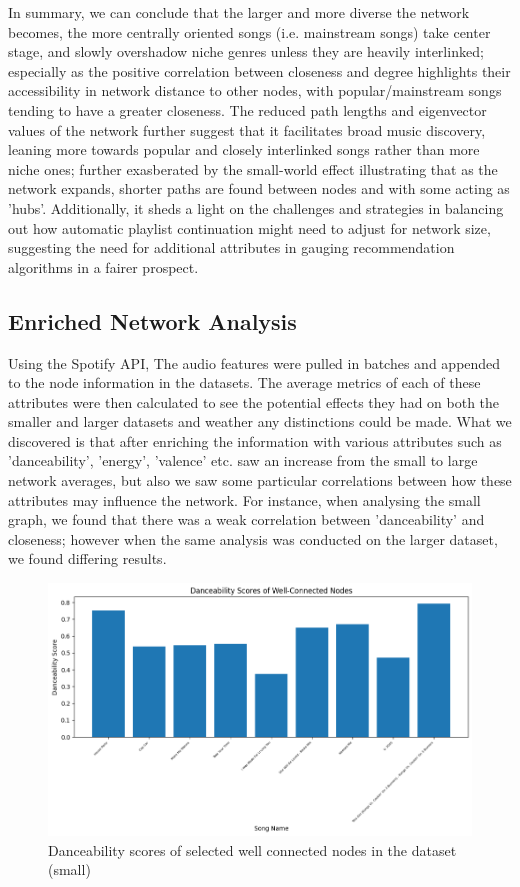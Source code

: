 \documentclass[conference]{IEEEtran}
\begin{document}
In summary, we can conclude that the larger and more diverse the network becomes, the more centrally oriented songs (i.e. mainstream songs) take center stage, and slowly overshadow niche genres unless they are heavily interlinked; especially as the positive correlation between closeness and degree highlights their accessibility in network distance to other nodes, with popular/mainstream songs tending to have a greater closeness. The reduced path lengths and eigenvector values of the network further suggest that it facilitates broad music discovery, leaning more towards popular and closely interlinked songs rather than more niche ones; further exasberated by the small-world effect illustrating that as the network expands, shorter paths are found between nodes and with some acting as 'hubs'. Additionally, it sheds a light on the challenges and strategies in balancing out how automatic playlist continuation might need to adjust for network size, suggesting the need for additional attributes in gauging recommendation algorithms in a fairer prospect.\\

\subsection{Enriched Network Analysis}
Using the Spotify API, The audio features were pulled in batches and appended to the node information in the datasets. The average metrics of each of these attributes were then calculated to see the potential effects they had on both the smaller and larger datasets and weather any distinctions could be made. What we discovered is that after enriching the information with various attributes such as 'danceability', 'energy', 'valence' etc. saw an increase from the small to large network averages, but also we saw some particular correlations between how these attributes may influence the network. For instance, when analysing the small graph, we found that there was a weak correlation between 'danceability' and closeness; however when the same analysis was conducted on the larger dataset, we found differing results. \\

\begin{figure}[h!]
    \centering
    \includegraphics[width=1\linewidth]{images/wcn.png}
    \caption{Danceability scores of selected well connected nodes in the dataset (small)}
    \label{fig:enter-label}
\end{figure}
\end{document}

